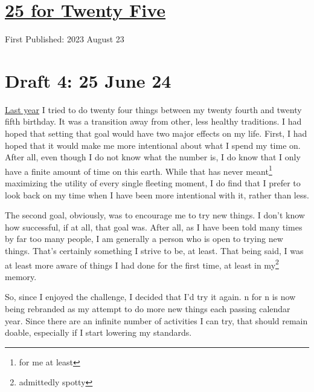 \documentclass[12pt]{article}[titlepage]
\newcommand{\1}{\={a}}
\newcommand{\2}{\={e}}
\newcommand{\3}{\={\i}}
\newcommand{\4}{\=o}
\newcommand{\5}{\=u}
\newcommand{\6}{\={A}}
\renewcommand{\,}{\textsuperscript{,}}
\begin{document}
\doublespacing
\section{\href{twenty-five.html}{25 for Twenty Five}}
First Published: 2023 August 23
\section{Draft 4: 25 June 24}
\href{twenty-four.html}{Last year} I tried to do twenty four things between my twenty fourth and twenty fifth birthday.
It was a transition away from other, less healthy traditions.
I had hoped that setting that goal would have two major effects on my life.
First, I had hoped that it would make me more intentional about what I spend my time on.
After all, even though I do not know what the number is, I do know that I only have a finite amount of time on this earth.
While that has never meant\footnote{for me at least} maximizing the utility of every single fleeting moment, I do find that I prefer to look back on my time when I have been more intentional with it, rather than less.

The second goal, obviously, was to encourage me to try new things.
I don't know how successful, if at all, that goal was.
After all, as I have been told many times by far too many people, I am generally a person who is open to trying new things.
That's certainly something I strive to be, at least.
That being said, I was at least more aware of things I had done for the first time, at least in my\footnote{admittedly spotty} memory.

So, since I enjoyed the challenge, I decided that I'd try it again.
n for n is now being rebranded as my attempt to do more new things each passing calendar year.
Since there are an infinite number of activities I can try, that should remain doable, especially if I start lowering my standards.
\end{document}

